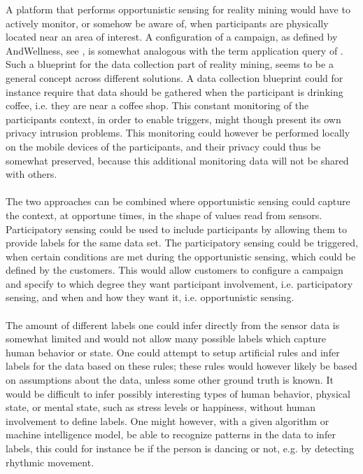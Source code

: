 A platform that performs opportunistic sensing for reality mining would have to actively monitor, or somehow be aware of, when participants are physically located near an area of interest. A configuration of a campaign, as defined by AndWellness, see , is somewhat analogous with the  term application query of \parencite{opp_or_par}. Such a blueprint for the data collection part of reality mining, seems to be a general concept across different solutions. A data collection blueprint could for instance require that data should be gathered when the participant is drinking coffee, i.e. they are near a coffee shop. This constant monitoring of the participants context, in order to enable triggers, might though present its own privacy intrusion problems. This monitoring could however be performed locally on the mobile devices of the participants, and their privacy could thus be somewhat preserved, because this additional monitoring data will not be shared with others. 
\\\\
The two approaches can be combined where opportunistic sensing could capture the context, at opportune times, in the shape of values read from sensors. Participatory sensing could be used to include participants by allowing them to provide labels for the same data set. The participatory sensing could be triggered, when certain conditions are met during the opportunistic sensing, which could be defined by the customers. This would allow customers to configure a campaign and specify to which degree they want participant involvement, i.e. participatory sensing, and when and how they want it, i.e. opportunistic sensing.
\\\\
The amount of different labels one could infer directly from the sensor data is somewhat limited and would not allow many possible labels which capture human behavior or state. One could attempt to setup artificial rules and infer labels for the data based on these rules; these rules would however likely be based on assumptions about the data, unless some other ground truth is known. It would be difficult to infer possibly interesting types of human behavior, physical state, or mental state, such as stress levels or happiness, without human involvement to define labels. One might however, with a given algorithm or machine intelligence model, be able to recognize patterns in the data to infer labels, this could for instance be if the person is dancing or not, e.g. by detecting rhythmic movement.    
